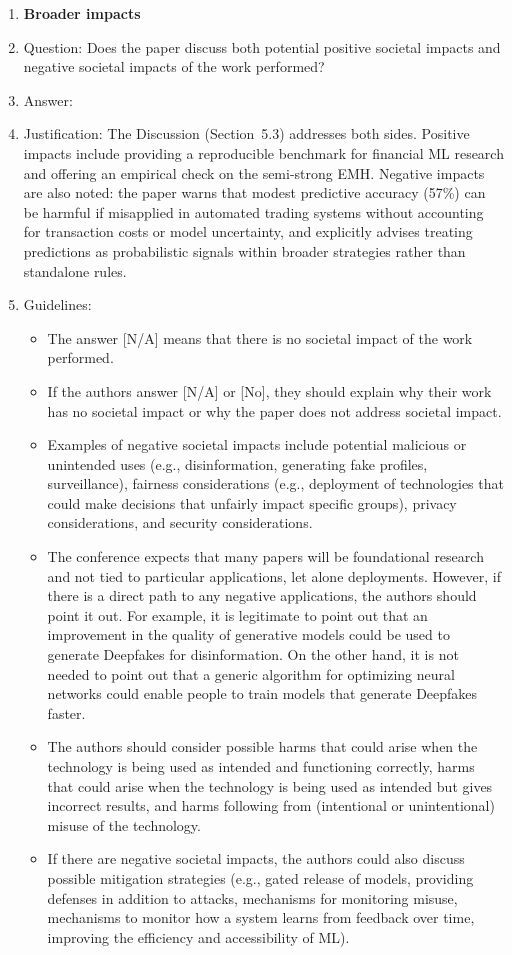 \documentclass{article}
\begin{document}
\begin{enumerate}
\item {\bf Broader impacts}
    \item[] Question: Does the paper discuss both potential positive societal impacts and negative
societal impacts of the work performed?
    \item[] Answer: \answerYes{}
    \item[] Justification: The Discussion (Section~5.3) addresses both sides. Positive impacts
    include providing a reproducible benchmark for financial ML research and offering an
    empirical check on the semi-strong EMH. Negative impacts are also noted: the paper warns
    that modest predictive accuracy (57\%) can be harmful if misapplied in automated trading
    systems without accounting for transaction costs or model uncertainty, and explicitly advises
    treating predictions as probabilistic signals within broader strategies rather than standalone
    rules.
    \item[] Guidelines:
    \begin{itemize}
        \item The answer [N/A] means that there is no societal impact of the work performed.
        \item If the authors answer [N/A] or [No], they should explain why their work has no societal
impact or why the paper does not address societal impact.
        \item Examples of negative societal impacts include potential malicious or unintended uses
(e.g., disinformation, generating fake profiles, surveillance), fairness considerations
(e.g., deployment of technologies that could make decisions that unfairly impact specific
groups), privacy considerations, and security considerations.
        \item The conference expects that many papers will be foundational research and not tied
to particular applications, let alone deployments. However, if there is a direct path to
any negative applications, the authors should point it out. For example, it is legitimate
to point out that an improvement in the quality of generative models could be used to
generate Deepfakes for disinformation. On the other hand, it is not needed to point out
that a generic algorithm for optimizing neural networks could enable people to train
models that generate Deepfakes faster.
        \item The authors should consider possible harms that could arise when the technology is
being used as intended and functioning correctly, harms that could arise when the
technology is being used as intended but gives incorrect results, and harms following
from (intentional or unintentional) misuse of the technology.
        \item If there are negative societal impacts, the authors could also discuss possible mitigation
strategies (e.g., gated release of models, providing defenses in addition to attacks,
mechanisms for monitoring misuse, mechanisms to monitor how a system learns from
feedback over time, improving the efficiency and accessibility of ML).
    \end{itemize}


\end{enumerate}
\end{document}
